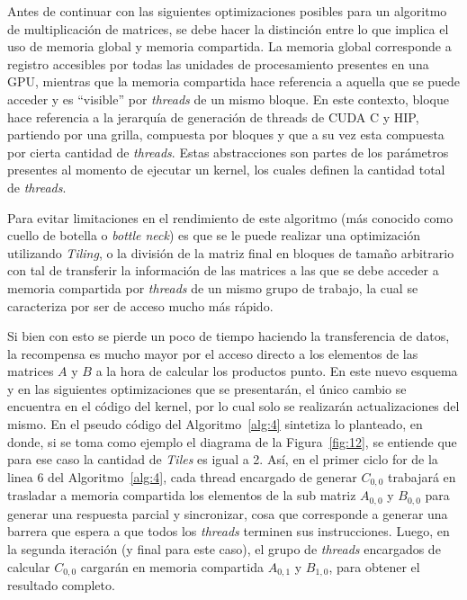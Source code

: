 Antes de continuar con las siguientes optimizaciones posibles para un algoritmo de multiplicación de matrices, se debe hacer la distinción entre lo que implica el uso de memoria global y memoria compartida.
La memoria global corresponde a registro accesibles por todas las unidades de procesamiento presentes en una GPU, mientras que la memoria compartida hace referencia a aquella que se puede acceder y es ``visible'' por \textit{threads} de un mismo bloque.
En este contexto, bloque hace referencia a la jerarquía de generación de threads de CUDA C y HIP, partiendo por una grilla, compuesta por bloques y que a su vez esta compuesta por cierta cantidad de \textit{threads}.
Estas abstracciones son partes de los parámetros presentes al momento de ejecutar un kernel, los cuales definen la cantidad total de \textit{threads}.

Para evitar limitaciones en el rendimiento de este algoritmo (más conocido como cuello de botella o \textit{bottle neck}) es que se le puede realizar una optimización utilizando \textit{Tiling}, o la división de la matriz final en bloques de tamaño arbitrario con tal de transferir la información de las matrices a las que se debe acceder a memoria compartida por \textit{threads} de un mismo grupo de trabajo, la cual se caracteriza por ser de acceso mucho más rápido.

Si bien con esto se pierde un poco de tiempo haciendo la transferencia de datos, la recompensa es mucho mayor por el acceso directo a los elementos de las matrices \(A\) y \(B\) a la hora de calcular los productos punto.
En este nuevo esquema y en las siguientes optimizaciones que se presentarán, el único cambio se encuentra en el código del kernel, por lo cual solo se realizarán actualizaciones del mismo.
En el pseudo código del Algoritmo~\ref{alg:4} sintetiza lo planteado, en donde, si se toma como ejemplo el diagrama de la Figura~\ref{fig:12}, se entiende que para ese caso la cantidad de \textit{Tiles} es igual a 2.
Así, en el primer ciclo for de la linea 6 del Algoritmo~\ref{alg:4}, cada thread encargado de generar \(C_{0,0}\) trabajará en trasladar a memoria compartida los elementos de la sub matriz \(A_{0,0}\) y \(B_{0,0}\) para generar una respuesta parcial y sincronizar, cosa que corresponde a generar una barrera que espera a que todos los \textit{threads} terminen sus instrucciones.
Luego, en la segunda iteración (y final para este caso), el grupo de \textit{threads} encargados de calcular \(C_{0,0}\) cargarán en memoria compartida \(A_{0,1}\) y \(B_{1,0}\), para obtener el resultado completo.


